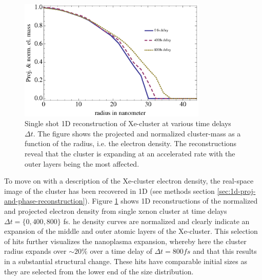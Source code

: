\begin{figure}
	\centering
		\includegraphics[width=0.80\textwidth]{images/results/Xe-reconstructions.eps}
	\caption{Single shot 1D reconstruction of Xe-cluster at various time delays $\Delta t$. The figure shows the projected and normalized cluster-mass as a function of the radius, i.e. the electron density. The reconstructions reveal that the cluster is expanding at an accelerated rate with the outer layers being the most affected.}
	\label{fig:Xe-reconstructions}
\end{figure}
To move on with a description of the Xe-cluster electron density, the real-space image of the cluster has been recovered in 1D (see methods section \ref{sec:1d-proj-and-phase-reconstruction}). Figure \ref{fig:Xe-reconstructions} shows 1D reconstructions of the normalized and projected electron density from single xenon cluster at time delays $\Delta t=\{0, 400, 800\}$ fs. he density curves are normalized and clearly indicate an expansion of the middle and outer atomic layers of the Xe-cluster. This selection of hits further visualizes the nanoplasma expansion, whereby here the cluster radius expands over $\sim 20\%$ over a time delay of $\Delta t=800 fs$ and that this results in a substantial structural change. These hits have comparable initial sizes as they are selected from the lower end of the size distribution.\\
